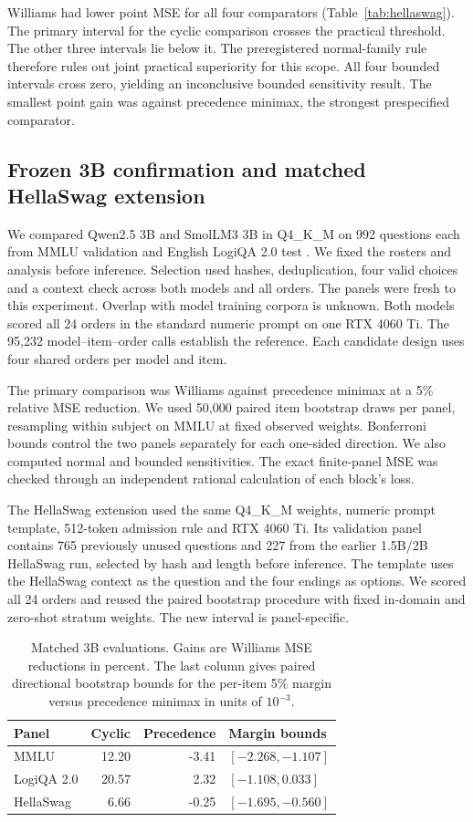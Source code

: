 \documentclass{article}
\begin{document}
Williams had lower point MSE for all four comparators
(Table~\ref{tab:hellaswag}). The primary interval for the cyclic
comparison crosses the practical threshold. The other three
intervals lie below it. The preregistered normal-family rule
therefore rules out joint practical superiority for this scope.
All four bounded intervals cross zero, yielding an inconclusive
bounded sensitivity result. The smallest point gain was against
precedence minimax, the strongest prespecified comparator.

\subsection{Frozen 3B confirmation and matched HellaSwag extension}
We compared Qwen2.5 3B and SmolLM3 3B in Q4\_K\_M on 992 questions
each from MMLU validation \citep{hendrycks2021} and English LogiQA
2.0 test \citep{liu2023logiqa}. We fixed the rosters and analysis
before inference. Selection used hashes, deduplication, four valid
choices and a context check across both models and all orders.
The panels were fresh to this experiment. Overlap with model
training corpora is unknown. Both models scored all 24 orders in
the standard numeric prompt on one RTX 4060 Ti. The 95,232
model--item--order calls establish the reference. Each candidate
design uses four shared orders per model and item.

The primary comparison was Williams against precedence minimax at
a 5\% relative MSE reduction. We used 50,000 paired item bootstrap
draws per panel, resampling within subject on MMLU at fixed
observed weights. Bonferroni bounds control the two panels
separately for each one-sided direction. We also computed normal
and bounded sensitivities. The exact finite-panel MSE was checked
through an independent rational calculation of each block's loss.

The HellaSwag extension used the same Q4\_K\_M weights,
numeric prompt template, 512-token admission rule and RTX 4060 Ti.
Its validation panel contains 765 previously unused questions and
227 from the earlier 1.5B/2B HellaSwag run, selected by hash and length
before inference. The template uses the HellaSwag context as the
question and the four endings as options. We scored all 24 orders
and reused the paired bootstrap procedure with fixed in-domain and
zero-shot stratum weights. The new interval is panel-specific.

\begin{table}[t]
\centering
\small
\caption{Matched 3B evaluations. Gains are Williams MSE reductions
in percent. The last column gives paired directional bootstrap
bounds for the per-item 5\% margin versus precedence minimax
in units of $10^{-3}$.}
\label{tab:3b-confirmation}
\begin{tabular}{lrrl}
\toprule
Panel & Cyclic & Precedence & Margin bounds \\
\midrule
MMLU & 12.20 & -3.41 & $[-2.268, -1.107]$ \\
LogiQA 2.0 & 20.57 & 2.32 & $[-1.108, 0.033]$ \\
HellaSwag & 6.66 & -0.25 & $[-1.695, -0.560]$ \\
\bottomrule
\end{tabular}
\end{table}
\end{document}
